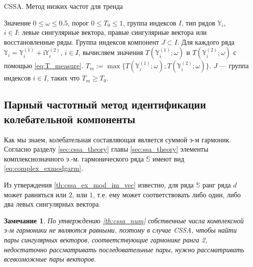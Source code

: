 \documentclass[specialist,
               substylefile = spbu.rtx,
               subf,href,colorlinks=true, 12pt]{disser}
\newcommand{\I}{\mathrm{i}}
\newtheorem{remark}{Замечание}
\begin{document}
\begin{algorithm}[!hhh]
\caption{CSSA. Метод низких частот для тренда}
\label{alg:freqcssa}
\begin{algorithmic}[1]
\REQUIRE Значение  $0 \leqslant  \omega \leqslant 0.5$, порог $0 \leqslant T_0 \leqslant 1$, группа индексов $I$, тип рядов $\mathbb{Y}_i$,\\ $i \in I$: левые сингулярные вектора, 
правые сингулярные вектора или восстановленные ряды.
\ENSURE Группа индексов компонент $J \subset I$.
\STATE  Для каждого ряда $\mathbb{Y}_i = \mathbb{Y}^{(1)}_i + \I \mathbb{Y}^{(2)}_i $, $i \in I$, вычисляем значения $T(\mathbb{Y}^{(1)}_i; \omega)$ и $T(\mathbb{Y}^{(2)}_i; \omega)$ с помощью \eqref{eq:T_measure}. $T_m := \max \{T(\mathbb{Y}^{(1)}_i; \omega); T(\mathbb{Y}^{(2)}_i; \omega)\}$.
\STATE $J$ --- группа индексов $i \in I$, таких что $T_m \geqslant T_0$.
\end{algorithmic}
\end{algorithm}

\subsection{Парный частотный метод идентификации колебательной компоненты}
Как мы знаем, колебательная составляющая является суммой э-м гармоник.
Согласно разделу \ref{sec:cssa_theory} главы \ref{sec:ssa_theory} элементы комплекснозначного э.-м. гармонического ряда $\mathbb{S}$ имеют вид \eqref{eq:complex_exmodgarm}.

Из утверждения \ref{th:cssa_ex_mod_im_vec} известно, для ряда $\mathbb{S}$ ранг ряда $d$ может равняться или $2$, или $1$, т.е. ему может соответствовать либо один, либо два левых сингулярных вектора. 

\begin{remark}
По утверждению \ref{th:cssa_num} собственные числа комплексной э-м гармоники не являются равными, поэтому в случае CSSA, чтобы найти пары сингулярных векторов, соответствующие гармонике ранга 2, недостаточно рассматривать последовательные пары, нужно рассматривать всевозможные пары векторов.
\end{remark}
\end{document}
